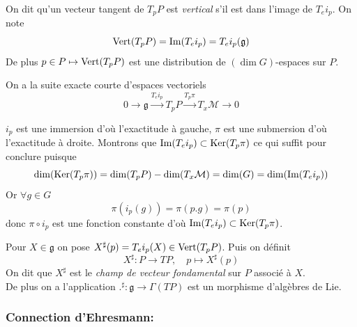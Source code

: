 \documentclass[12pt, a4paper]{book}
\begin{document}
\begin{defi}
On dit qu'un vecteur tangent de $T_pP$ est \emph{vertical} s'il est dans l'image de $T_e i_p$. On note 
$$\operatorname{Vert}(T_pP) = \operatorname{Im}(T_e i_p) = T_e i_p(\mathfrak{g})$$
De plus $p\in P \mapsto \operatorname{Vert}(T_pP)$ est une distribution de $(\dim G)$-espaces sur $P$. 
\end{defi}

\begin{pro}
On a la suite exacte courte d'espaces vectoriels
$$0 \to \mathfrak{g} \overset{T_e i_p}{\longrightarrow} T_p P \overset{T_p \pi}{\longrightarrow} T_x\mathcal{M} \to 0$$ 
\end{pro}
\begin{preu}
$i_p$ est une immersion d'où l'exactitude à gauche, $\pi$ est une submersion d'où l'exactitude à droite. Montrons que $\operatorname{Im}(T_e i_p) \subset \operatorname{Ker}(T_p \pi)$ ce qui suffit pour conclure puisque 
$$\dim(\operatorname{Ker}(T_p \pi)) = \dim(T_p P) - \dim(T_x\mathcal{M}) = \dim(G) = \dim(\operatorname{Im}(T_e i_p))$$
Or $\forall g\in G$
$$\pi(i_p(g)) = \pi(p.g) = \pi(p)$$ 
donc $\pi\circ i_p$ est une fonction constante d'où $\operatorname{Im}(T_e i_p) \subset \operatorname{Ker}(T_p \pi)$.
\end{preu}

\begin{defi}
Pour $X\in \mathfrak{g}$ on pose $X^\sharp(p) = T_e i_p(X) \in \operatorname{Vert}(T_pP)$. Puis on définit 
$$X^\sharp: P \to TP, \quad p \mapsto X^\sharp(p)$$
On dit que $X^\sharp$ est le \emph{champ de vecteur fondamental} sur $P$ associé à $X$. \\
De plus on a l'application $.^\sharp : \mathfrak{g} \to \Gamma(TP)$ est un morphisme d'algèbres de Lie.
\end{defi}

\subsubsection{Connection d'Ehresmann:}
\end{document}
